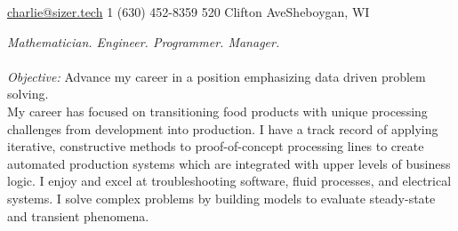 \documentclass[10pt,a4paper]{article} %
\begin{document}
 



\noindent\href{mailto:charlie@sizer.tech}{charlie@sizer.tech}\bull %
\textsmaller{+}1 (630) 452-8359\bull %
520 Clifton Ave\bull Sheboygan, WI%

\spacedhrule{0.9em}{-0.4em} %



\vspace{-1.3em} %

\begin{multicols}{2}  %
\noindent \textit{Mathematician. Engineer. Programmer. Manager.}\\\\
\emph{Objective: }Advance my career in a position emphasizing  data driven problem solving. \\

My career has focused on transitioning food products with unique processing challenges from development into production. 
I have a track record of applying iterative, constructive methods to proof-of-concept processing lines to create automated production systems which are integrated with upper levels of business logic. 
I enjoy and excel at troubleshooting software, fluid processes, and electrical systems.
I solve complex problems by building models to evaluate steady-state and transient phenomena.

\end{multicols}

\spacedhrule{0.5em}{-0.4em} %
\end{document}
